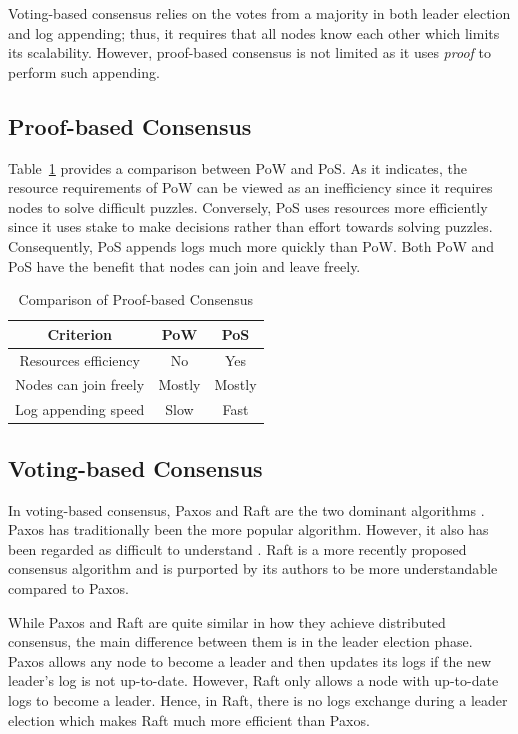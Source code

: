 \documentclass[12pt, a4paper]{article}
\begin{document}
Voting-based consensus relies on the votes from a majority
in both leader election and log appending; thus,
it requires that all nodes know each other which limits its scalability.
However, proof-based consensus is not limited as
it uses \textit{proof} to perform such appending.

\subsection{Proof-based Consensus}
Table~\ref{proof-based-comparison} provides a comparison between PoW and PoS.
As it indicates, the resource requirements of PoW can be viewed as an inefficiency since it requires nodes to solve difficult puzzles. Conversely, PoS uses resources more efficiently since it uses stake to make decisions rather than effort towards solving puzzles.
Consequently, PoS appends logs much more quickly than PoW.
Both PoW and PoS have the benefit that nodes can join and leave freely.

\begin{table}[htp]
\centering
\begin{tabular}{ccc}
\toprule
\textbf{Criterion} & \textbf{PoW} & \textbf{PoS}
\\ \midrule
Resources efficiency & No & Yes\\
Nodes can join freely & Mostly & Mostly \\
Log appending speed & Slow & Fast \\
\bottomrule
\end{tabular}
 \caption{Comparison of Proof-based Consensus }
    \label{proof-based-comparison}
\end{table}

\subsection{Voting-based Consensus}
In voting-based consensus, Paxos and Raft are the two dominant algorithms
\cite{howard2020paxos}. Paxos has traditionally been the more popular algorithm. However, it also has been regarded as difficult to understand \cite{conf/usenix/OngaroO14}. Raft is a more recently proposed consensus algorithm and is purported by its authors to be more understandable compared to Paxos.

While Paxos and Raft are quite similar in how they achieve distributed consensus, the main difference between them is in the leader election phase. Paxos allows any node to become a leader and then updates its logs
if the new leader's log is not up-to-date. However, Raft only allows a node with up-to-date logs to become a leader. Hence, in Raft, there is no logs exchange during a leader election which makes Raft much more efficient than Paxos.
\end{document}
